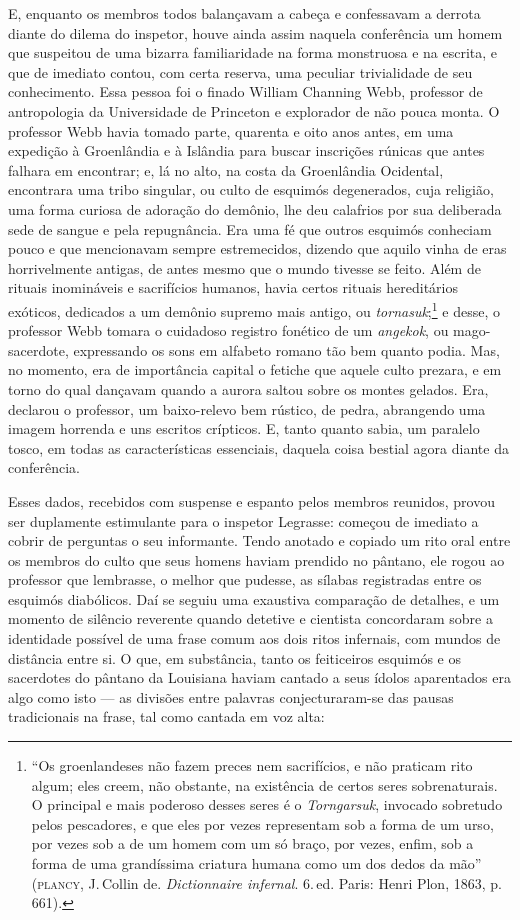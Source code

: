 E, enquanto os membros todos balançavam a cabeça e confessavam a
derrota diante do dilema do inspetor, houve ainda assim naquela
conferência um homem que suspeitou de uma bizarra familiaridade na forma
monstruosa e na escrita, e que de imediato contou, com certa reserva,
uma peculiar trivialidade de seu conhecimento. Essa pessoa foi o finado
William Channing Webb, professor de antropologia da Universidade de
Princeton e explorador de não pouca monta. O professor Webb havia
tomado parte, quarenta e oito anos antes, em uma expedição à Groenlândia
e à Islândia para buscar inscrições rúnicas que antes falhara em
encontrar; e, lá no alto, na costa da Groenlândia Ocidental, encontrara
uma tribo singular, ou culto de esquimós degenerados, cuja religião, uma
forma curiosa de adoração do demônio, lhe deu calafrios por sua
deliberada sede de sangue e pela repugnância. Era uma fé que outros esquimós
conheciam pouco e que mencionavam sempre estremecidos, dizendo que
aquilo vinha de eras horrivelmente antigas, de antes mesmo que o mundo
tivesse se feito. Além de rituais inomináveis e sacrifícios humanos, havia
certos rituais hereditários exóticos, dedicados a um demônio supremo
mais antigo, ou \emph{tornasuk};\footnote{``Os groenlandeses não fazem
  preces nem sacrifícios, e não praticam rito algum; eles creem, não
  obstante, na existência de certos seres sobrenaturais. O principal e
  mais poderoso desses seres é o \emph{Torngarsuk}, invocado sobretudo
  pelos pescadores, e que eles por vezes representam sob a forma de um
  urso, por vezes sob a de um homem com um só braço, por vezes, enfim,
  sob a forma de uma grandíssima criatura humana como um dos dedos da
  mão'' (\textsc{plancy}, J.\,Collin de. \emph{Dictionnaire infernal}.
  6.\,ed. Paris: Henri
  Plon, 1863, p.\,661).} e desse, o professor Webb
tomara o cuidadoso registro fonético de um \emph{angekok}, ou
mago-sacerdote, expressando os sons em alfabeto romano tão bem quanto
podia. Mas, no momento, era de importância capital o fetiche que
aquele culto prezara, e em torno do qual dançavam quando a aurora saltou
sobre os montes gelados. Era, declarou o professor, um baixo-relevo bem
rústico, de pedra, abrangendo uma imagem horrenda e uns escritos
crípticos. E, tanto quanto sabia, um paralelo tosco, em todas as
características essenciais, daquela coisa bestial agora diante da
conferência.

Esses dados, recebidos com suspense e espanto pelos membros reunidos,
provou ser duplamente estimulante para o inspetor Legrasse: começou de
imediato a cobrir de perguntas o seu informante. Tendo anotado e copiado
um rito oral entre os membros do culto que seus homens haviam prendido
no pântano, ele rogou ao professor que lembrasse, o melhor que pudesse,
as sílabas registradas entre os esquimós diabólicos. Daí se seguiu uma
exaustiva comparação de detalhes, e um momento de silêncio reverente
quando detetive e cientista concordaram sobre a identidade possível de
uma frase comum aos dois ritos infernais, com mundos de distância entre
si. O que, em substância, tanto os feiticeiros esquimós e os sacerdotes
do pântano da Louisiana haviam cantado a seus ídolos aparentados era
algo como isto --- as divisões entre palavras conjecturaram-se das
pausas tradicionais na frase, tal como cantada em voz alta:

